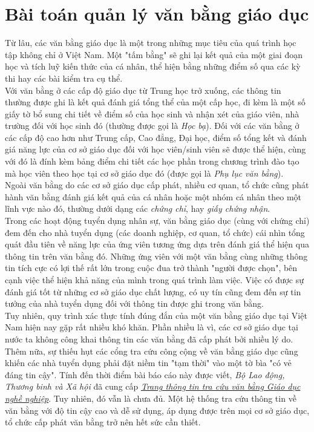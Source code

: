 \chapter{Bài toán quản lý văn bằng giáo dục}

Từ lâu, các văn bằng giáo dục là một trong những mục tiêu của quá trình học tập không chỉ ở Việt Nam. Một "tấm bằng" sẽ ghi lại kết quả của một giai đoạn học và tích luỹ kiến thức của cá nhân, thể hiện bằng những điểm số qua các kỳ thi hay các bài kiểm tra cụ thể.\\

Với văn bằng ở các cấp độ giáo dục từ Trung học trở xuống, các thông tin thường được ghi là kết quả đánh giá tổng thể của một cấp học, đi kèm là một số giấy tờ bổ sung chi tiết về điểm số của học sinh và nhận xét của giáo viên, nhà trường đối với học sinh đó (thường được gọi là \textit{Học bạ}). Đối với các văn bằng ở các cấp độ cao hơn như Trung cấp, Cao đẳng, Đại học, điểm số tổng kết và đánh giá năng lực của cơ sở giáo dục đối với học viên/sinh viên sẽ được thể hiện, cùng với đó là đính kèm bảng điểm chi tiết các học phần trong chương trình đào tạo mà học viên theo học tại cơ sở giáo dục đó (được gọi là \textit{Phụ lục văn bằng}).\\

Ngoài văn bằng do các cơ sở giáo dục cấp phát, nhiều cơ quan, tổ chức cũng phát hành văn bằng đánh giá kết quả của cá nhân hoặc một nhóm cá nhân theo một lĩnh vực nào đó, thường dưới dạng các \textit{chứng chỉ}, hay \textit{giấy chứng nhận}.\\

Trong các hoạt động tuyển dụng nhân sự, văn bằng giáo dục (cùng với chứng chỉ) đem đến cho nhà tuyển dụng (các doanh nghiệp, cơ quan, tổ chức) cái nhìn tổng quát đầu tiên về năng lực của ứng viên tương ứng dựa trên đánh giá thể hiện qua thông tin trên văn bằng đó. Những ứng viên với một văn bằng cùng những thông tin tích cực có lợi thế rất lớn trong cuộc đua trở thành "người được chọn", bên cạnh việc thể hiện khả năng của mình trong quá trình làm việc. Việc có được sự đánh giá tốt từ những cơ sở giáo dục chất lượng, có uy tín cũng đem đến sự tin tưởng của nhà tuyển dụng đối với thông tin được ghi trong văn bằng.\\

Tuy nhiên, quy trình xác thực tính đúng đắn của một văn bằng giáo dục tại Việt Nam hiện nay gặp rất nhiều khó khăn. Phần nhiều là vì, các cơ sở giáo dục tại nước ta không công khai thông tin các văn bằng đã cấp phát bởi nhiều lý do. Thêm nữa, sự thiếu hụt các cổng tra cứu công cộng về văn bằng giáo dục cũng khiến các nhà tuyển dụng phải đặt niềm tin "tạm thời" vào một tờ bìa "có vẻ đáng tin cậy". Tính đến thời điểm bài báo cáo này được viết, \textit{Bộ Lao động, Thương binh và Xã hội} đã cung cấp \href{https://vanbang.gdnn.gov.vn/}{\textit{Trang thông tin tra cứu văn bằng Giáo dục nghề nghiệp}}. Tuy nhiên, đó vẫn là chưa đủ. Một hệ thống tra cứu thông tin về văn bằng với độ tin cậy cao và dễ sử dụng, áp dụng được trên mọi cơ sở giáo dục, tổ chức cấp phát văn bằng trở nên hết sức cần thiết.

